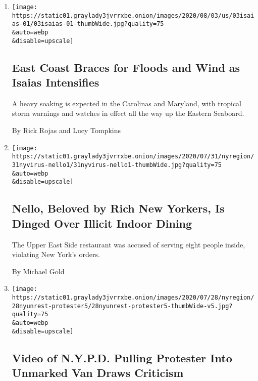 \begin{enumerate}
\def\labelenumi{\arabic{enumi}.}
\item
  \href{/2020/08/03/us/isaias-east-coast-landfall.html}{}

  \texttt{[image: https://static01.graylady3jvrrxbe.onion/images/2020/08/03/us/03isaias-01/03isaias-01-thumbWide.jpg?quality=75\\\&auto=webp\\\&disable=upscale]}

  \hypertarget{east-coast-braces-for-floods-and-wind-as-isaias-intensifies}{%
  \subsection{East Coast Braces for Floods and Wind as Isaias
  Intensifies}\label{east-coast-braces-for-floods-and-wind-as-isaias-intensifies}}

  A heavy soaking is expected in the Carolinas and Maryland, with
  tropical storm warnings and watches in effect all the way up the
  Eastern Seaboard.

  By Rick Rojas and Lucy Tompkins
\item
  \href{/2020/07/31/nyregion/nello-liquor-license-suspended.html}{}

  \texttt{[image: https://static01.graylady3jvrrxbe.onion/images/2020/07/31/nyregion/31nyvirus-nello1/31nyvirus-nello1-thumbWide.jpg?quality=75\\\&auto=webp\\\&disable=upscale]}

  \hypertarget{nello-beloved-by-rich-new-yorkers-is-dinged-over-illicit-indoor-dining}{%
  \subsection{Nello, Beloved by Rich New Yorkers, Is Dinged Over Illicit
  Indoor
  Dining}\label{nello-beloved-by-rich-new-yorkers-is-dinged-over-illicit-indoor-dining}}

  The Upper East Side restaurant was accused of serving eight people
  inside, violating New York's orders.

  By Michael Gold
\item
  \href{/2020/07/28/nyregion/nypd-protester-van.html}{}

  \texttt{[image: https://static01.graylady3jvrrxbe.onion/images/2020/07/28/nyregion/28nyunrest-protester5/28nyunrest-protester5-thumbWide-v5.jpg?quality=75\\\&auto=webp\\\&disable=upscale]}

  \hypertarget{video-of-nypd-pulling-protester-into-unmarked-van-draws-criticism}{%
  \subsection{Video of N.Y.P.D. Pulling Protester Into Unmarked Van
  Draws
  Criticism}\label{video-of-nypd-pulling-protester-into-unmarked-van-draws-criticism}}


\end{enumerate}
